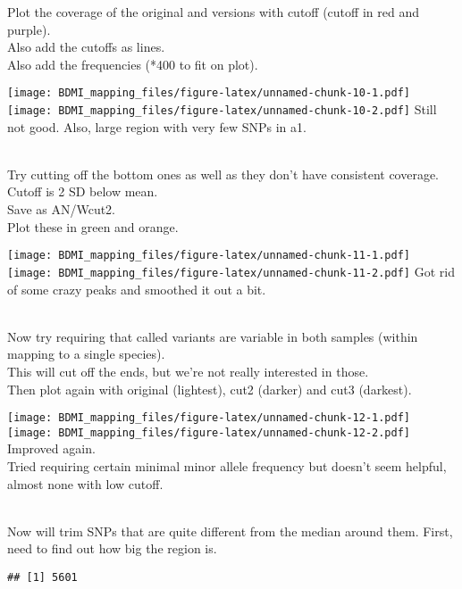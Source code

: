 \documentclass[
]{article}
\newenvironment{Shaded}{\begin{snugshade}}{\end{snugshade}}
\newcommand{\FunctionTok}[1]{\textcolor[rgb]{0.13,0.29,0.53}{\textbf{#1}}}
\newcommand{\NormalTok}[1]{#1}
\newcommand{\SpecialCharTok}[1]{\textcolor[rgb]{0.81,0.36,0.00}{\textbf{#1}}}
\begin{document}
Plot the coverage of the original and versions with cutoff (cutoff in
red and purple).\\
Also add the cutoffs as lines.\\
Also add the frequencies (*400 to fit on plot).

\texttt{[image: BDMI\_mapping\_files/figure-latex/unnamed-chunk-10-1.pdf]}
\texttt{[image: BDMI\_mapping\_files/figure-latex/unnamed-chunk-10-2.pdf]}
Still not good. Also, large region with very few SNPs in a1.\\
\strut \\
Try cutting off the bottom ones as well as they don't have consistent
coverage.\\
Cutoff is 2 SD below mean.\\
Save as AN/Wcut2.\\
Plot these in green and orange.

\texttt{[image: BDMI\_mapping\_files/figure-latex/unnamed-chunk-11-1.pdf]}
\texttt{[image: BDMI\_mapping\_files/figure-latex/unnamed-chunk-11-2.pdf]}
Got rid of some crazy peaks and smoothed it out a bit.\\
\strut \\
Now try requiring that called variants are variable in both samples
(within mapping to a single species).\\
This will cut off the ends, but we're not really interested in those.\\
Then plot again with original (lightest), cut2 (darker) and cut3
(darkest).

\texttt{[image: BDMI\_mapping\_files/figure-latex/unnamed-chunk-12-1.pdf]}
\texttt{[image: BDMI\_mapping\_files/figure-latex/unnamed-chunk-12-2.pdf]}
Improved again.\\
Tried requiring certain minimal minor allele frequency but doesn't seem
helpful, almost none with low cutoff.\\
\strut \\
Now will trim SNPs that are quite different from the median around them.
First, need to find out how big the region is.

\begin{Shaded}
\end{Shaded}

\begin{verbatim}
## [1] 5601
\end{verbatim}
\end{document}
